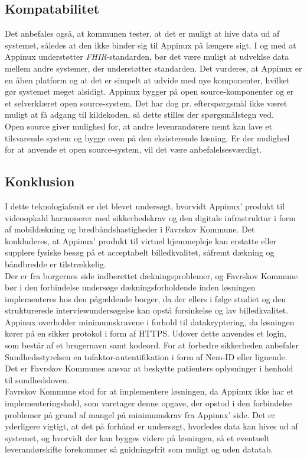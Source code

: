 \subsection{Kompatabilitet}
Det anbefales også, at kommunen tester, at det er muligt at hive data ud af systemet, således at den ikke binder sig til Appinux på længere sigt. I og med at Appinux understøtter \textit{FHIR}-standarden, bør det være muligt at udveklse data mellem andre systemer, der understøtter standarden. Det vurderes, at Appinux er en åben platform og at det er simpelt at udvide med nye komponenter, hvilket gør systemet meget alsidigt. Appinux bygger på open source-komponenter og er et selverklæret open source-system. Det har dog pr. efterspørgsmål ikke været muligt at få adgang til kildekoden, så dette stilles der spørgsmålstegn ved.\\Open source giver mulighed for, at andre levenrandørere nemt kan lave et tilsvarende system og bygge oven på den eksisterende løsning. Er der mulighed for at anvende et open source-system, vil det være anbefalelsesværdigt.
\subsection{Konklusion}
I dette teknologiafsnit er det blevet undersøgt, hvorvidt Appinux’ produkt til videoopkald harmonerer med sikkerhedskrav og den digitale infrastruktur i form af mobildækning og bredbåndshastigheder i Favrskov Kommune.
Det konkluderes, at Appinux’ produkt til virtuel hjemmepleje kan erstatte eller supplere fysiske besøg på et acceptabelt billedkvalitet, såfremt dækning og båndbredde er tilstrækkelig.
\\Der er fra borgernes side indberettet dækningsproblemer, og Favrskov Kommune bør i den forbindelse undersøge dækningsforholdende inden løsningen implementeres hos den pågældende borger, da der ellers i følge studiet  og den strukturerede interviewundersøgelse kan opstå forsinkelse og lav billedkvalitet.\\
Appinux overholder minimumskravene i forhold til datakryptering, da løsningen kører på en sikker protokol i form af HTTPS. Udover dette anvendes et login, som består af et brugernavn samt kodeord. For at forbedre sikkerheden anbefaler Sundhedsstyrelsen en tofaktor-autentifikation i form af Nem-ID eller lignende. Det er Favrskov Kommunes ansvar at beskytte patienters oplysninger i henhold til sundhedsloven.\\ 
Favrskov Kommune stod for at implementere løsningen, da Appinux ikke har et implementeringshold, som varetager denne opgave, der opstod i den forbindelse problemer på grund af mangel på minimumskrav fra Appinux' side. Det er yderligere vigtigt, at det på forhånd er undersøgt, hvorledes data kan hives ud af systemet, og hvorvidt der kan bygges videre på løsningen, så et eventuelt leverandørskifte forekommer så gnidningsfrit som muligt og uden datatab.
